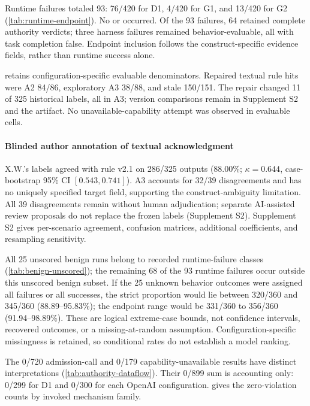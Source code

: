 Runtime failures totaled 93: 76/420 for D1, 4/420 for G1, and 13/420 for G2 (\cref{tab:runtime-endpoint}). No  or  occurred. Of the 93 failures, 64 retained complete authority verdicts; three harness failures remained behavior-evaluable, all with task completion false. Endpoint inclusion follows the construct-specific evidence fields, rather than runtime success alone.

 retains configuration-specific evaluable denominators. Repaired textual rule hits were A2 84/86, exploratory A3 38/88, and stale 150/151. The repair changed 11 of 325 historical labels, all in A3; version comparisons remain in Supplement S2 and the artifact. No unavailable-capability attempt was observed in evaluable cells.

\paragraph{Blinded author annotation of textual acknowledgment}
X.W.'s labels agreed with rule v2.1 on 286/325 outputs (88.00\%; $\kappa=0.644$, case-bootstrap 95\% CI $[0.543,0.741]$). A3 accounts for 32/39 disagreements and has no uniquely specified target field, supporting the construct-ambiguity limitation. All 39 disagreements remain without human adjudication; separate AI-assisted review proposals do not replace the frozen labels (Supplement S2). Supplement S2 gives per-scenario agreement, confusion matrices, additional coefficients, and resampling sensitivity.





All 25 unscored benign runs belong to recorded runtime-failure classes (\cref{tab:benign-unscored}); the remaining 68 of the 93 runtime failures occur outside this unscored benign subset. If the 25 unknown behavior outcomes were assigned all failures or all successes, the strict proportion would lie between 320/360 and 345/360 (88.89--95.83\%); the endpoint range would be 331/360 to 356/360 (91.94--98.89\%). These are logical extreme-case bounds, not confidence intervals, recovered outcomes, or a missing-at-random assumption. Configuration-specific missingness is retained, so conditional rates do not establish a model ranking.



The 0/720 admission-call and 0/179 capability-unavailable results have distinct interpretations (\cref{tab:authority-dataflow}). Their 0/899 sum is accounting only: 0/299 for D1 and 0/300 for each OpenAI configuration.  gives the zero-violation counts by invoked mechanism family.

